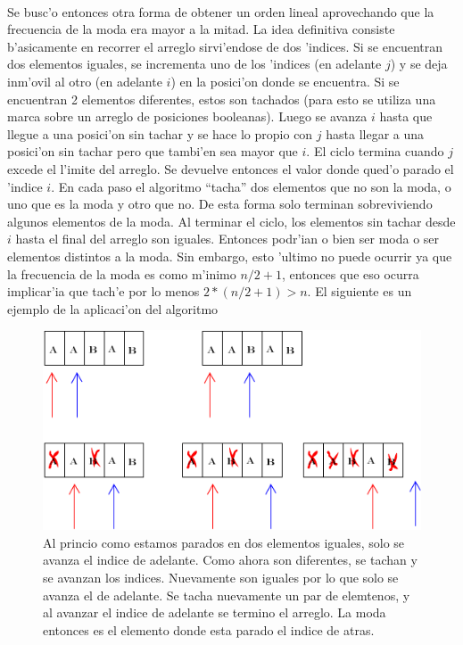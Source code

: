 \paragraph{}
Se busc'o entonces otra forma de  obtener un orden lineal aprovechando que la frecuencia de la moda 
era mayor a la mitad. La idea definitiva consiste b'asicamente en recorrer el  arreglo sirvi'endose de 
dos 'indices. Si se encuentran dos elementos iguales, se incrementa uno de los 'indices (en adelante $j$) 
y se deja inm'ovil al otro (en adelante $i$) en la posici'on donde se encuentra. Si se encuentran 2 
elementos diferentes, estos son tachados (para esto se utiliza una marca sobre un arreglo de posiciones booleanas). 
Luego se avanza $i$ hasta que llegue a una posici'on sin tachar y se hace lo propio con $j$ hasta llegar 
a una posici'on sin tachar pero que tambi'en sea mayor que $i$. El ciclo termina cuando $j$ excede el l'imite 
del arreglo. Se devuelve entonces el valor donde qued'o parado el 'indice $i$. 
En cada paso el algoritmo ``tacha'' dos elementos que no son la moda, o uno que es la moda y otro que no. 
De esta forma solo terminan sobreviviendo algunos elementos de la moda. Al terminar el ciclo, los elementos
sin tachar desde $i$ hasta el final del arreglo son iguales. Entonces podr'ian o bien ser moda o ser elementos 
distintos a la moda. Sin embargo, esto 'ultimo no puede ocurrir ya que la frecuencia de la moda es como m'inimo 
$n/2+1$, entonces que eso ocurra implicar'ia que tach'e por lo menos $2*(n/2+1) > n$.
El siguiente es un ejemplo de la aplicaci'on del algoritmo
\begin{figure}[H]
\centering
\includegraphics[scale=0.7]{./ejemplo.png}
\caption{Al princio como estamos parados en dos elementos iguales, solo se avanza el indice de adelante. Como ahora son diferentes, se tachan y se avanzan los indices. Nuevamente son iguales por lo que solo se avanza el de adelante. Se tacha nuevamente un par de elemtenos, y al avanzar el indice de adelante se termino el arreglo. La moda entonces es el elemento donde esta parado el indice de atras.}
\end{figure}

